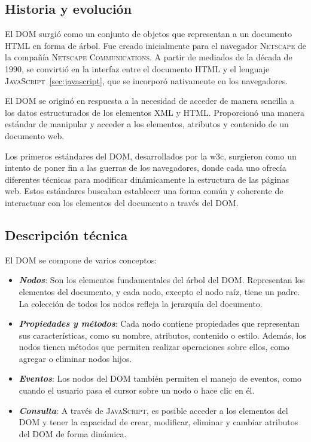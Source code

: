 \documentclass[a4paper, 11pt]{book}
\begin{document}
\subsection{Historia y evolución}
El \textsc{DOM} surgió como un conjunto de objetos que representan a un documento \textsc{HTML} en forma de árbol. Fue creado inicialmente para el navegador \textsc{Netscape} de la compañía \textsc{Netscape Communications}. A partir de mediados de la década de 1990, se convirtió en la interfaz entre el documento \textsc{HTML} y el lenguaje \textsc{JavaScript}~\ref{sec:javascript}, que se incorporó nativamente en los navegadores.

El \textsc{DOM} se originó en respuesta a la necesidad de acceder de manera sencilla a los datos estructurados de los elementos \textsc{XML} y \textsc{HTML}. Proporcionó una manera estándar de manipular y acceder a los elementos, atributos y contenido de un documento web.

Los primeros estándares del \textsc{DOM}, desarrollados por la \gls{w3c}, surgieron como un intento de poner fin a las guerras de los navegadores, donde cada uno ofrecía diferentes técnicas para modificar dinámicamente la estructura de las páginas web. Estos estándares buscaban establecer una forma común y coherente de interactuar con los elementos del documento a través del \textsc{DOM}.
\subsection{Descripción técnica}
El \textsc{DOM} se compone de varios conceptos:
\begin{itemize}
	\item \textbf{\emph{Nodos}}: Son los elementos fundamentales del árbol del \textsc{DOM}. Representan los elementos del documento, y cada nodo, excepto el nodo raíz, tiene un padre. La colección de todos los nodos refleja la jerarquía del documento.
	\item \textbf{\emph{Propiedades y métodos}}: Cada nodo contiene propiedades que representan sus características, como su nombre, atributos, contenido o estilo. Además, los nodos tienen métodos que permiten realizar operaciones sobre ellos, como agregar o eliminar nodos hijos.
	\item \textbf{\emph{Eventos}}: Los nodos del \textsc{DOM} también permiten el manejo de eventos, como cuando el usuario pasa el cursor sobre un nodo o hace clic en él.
	\item \textbf{\emph{Consulta}}: A través de \textsc{JavaScript}, es posible acceder a los elementos del \textsc{DOM} y tener la capacidad de crear, modificar, eliminar y cambiar atributos del \textsc{DOM} de forma dinámica.
\end{itemize}
\end{document}
